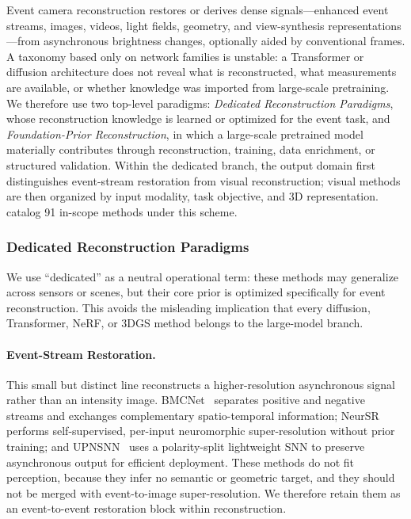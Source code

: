 Event camera reconstruction restores or derives dense signals---enhanced event streams, images, videos, light fields, geometry, and view-synthesis representations---from asynchronous brightness changes, optionally aided by conventional frames. A taxonomy based only on network families is unstable: a Transformer or diffusion architecture does not reveal what is reconstructed, what measurements are available, or whether knowledge was imported from large-scale pretraining. We therefore use two top-level paradigms: \textit{Dedicated Reconstruction Paradigms}, whose reconstruction knowledge is learned or optimized for the event task, and \textit{Foundation-Prior Reconstruction}, in which a large-scale pretrained model materially contributes through reconstruction, training, data enrichment, or structured validation. Within the dedicated branch, the output domain first distinguishes event-stream restoration from visual reconstruction; visual methods are then organized by input modality, task objective, and 3D representation.  catalog 91 in-scope methods under this scheme.

\subsubsection{Dedicated Reconstruction Paradigms}
\label{sec:recon_dedicated}

We use ``dedicated'' as a neutral operational term: these methods may generalize across sensors or scenes, but their core prior is optimized specifically for event reconstruction. This avoids the misleading implication that every diffusion, Transformer, NeRF, or 3DGS method belongs to the large-model branch.

\paragraph{Event-Stream Restoration.}
This small but distinct line reconstructs a higher-resolution asynchronous signal rather than an intensity image. BMCNet~\cite{huang2024bilateral} separates positive and negative streams and exchanges complementary spatio-temporal information; NeurSR~\cite{zhang2024neuromorphic} performs self-supervised, per-input neuromorphic super-resolution without prior training; and UPNSNN~\cite{xu2026ultralight} uses a polarity-split lightweight SNN to preserve asynchronous output for efficient deployment. These methods do not fit perception, because they infer no semantic or geometric target, and they should not be merged with event-to-image super-resolution. We therefore retain them as an event-to-event restoration block within reconstruction.


